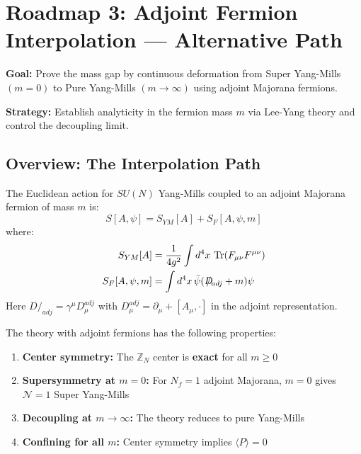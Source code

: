 \section{Roadmap 3: Adjoint Fermion Interpolation --- Alternative Path}
\label{sec:roadmap3-adjoint}

\textbf{Goal:} Prove the mass gap by continuous deformation from Super Yang-Mills 
$(m = 0)$ to Pure Yang-Mills $(m \to \infty)$ using adjoint Majorana fermions.

\textbf{Strategy:} Establish analyticity in the fermion mass $m$ via Lee-Yang 
theory and control the decoupling limit.

\subsection{Overview: The Interpolation Path}
\label{subsec:roadmap3-overview}

\begin{definition}
\label{def:adjoint-qcd-app90}
The Euclidean action for $SU(N)$ Yang-Mills coupled to an adjoint Majorana 
fermion of mass $m$ is:
\[
S[A, \psi] = S_{YM}[A] + S_F[A, \psi, m]
\]
where:
\begin{align}
S_{YM}[A] &= \frac{1}{4g^2} \int d^4x \, \operatorname{Tr}(F_{\mu\nu} F^{\mu\nu}) \\
S_F[A, \psi, m] &= \int d^4x \, \bar{\psi}(D\!\!\!\!/_{adj} + m)\psi
\end{align}
Here $D\!\!\!\!/_{adj} = \gamma^\mu D_\mu^{adj}$ with $D_\mu^{adj} = \partial_\mu + [A_\mu, \cdot]$ 
in the adjoint representation.
\end{definition}

\begin{proposition}
\label{prop:adjoint-properties}
The theory with adjoint fermions has the following properties:
\begin{enumerate}[label=(\roman*)]
\item \textbf{Center symmetry:} The $\mathbb{Z}_N$ center is \textbf{exact} for all $m \geq 0$
\item \textbf{Supersymmetry at $m = 0$:} For $N_f = 1$ adjoint Majorana, $m = 0$ 
      gives $\mathcal{N} = 1$ Super Yang-Mills
\item \textbf{Decoupling at $m \to \infty$:} The theory reduces to pure Yang-Mills
\item \textbf{Confining for all $m$:} Center symmetry implies $\langle P \rangle = 0$
\end{enumerate}
\end{proposition}

